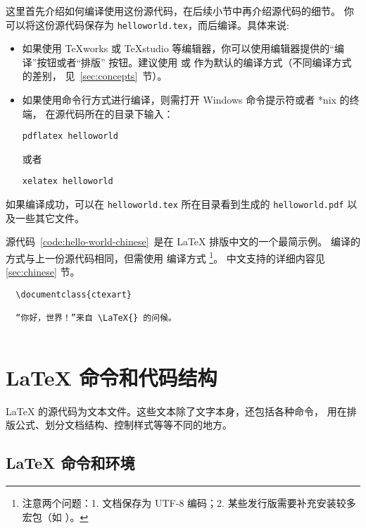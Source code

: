 这里首先介绍如何编译使用这份源代码，在后续小节中再介绍源代码的细节。
你可以将这份源代码保存为 \texttt{helloworld.tex}，而后编译。具体来说:
\begin{itemize}
  \item 如果使用 TeXworks 或 TeXstudio 等编辑器，你可以使用编辑器提供的“编译”按钮或者“排版”
  按钮。建议使用  或  作为默认的编译方式（不同编译方式的差别，
  见~\ref{sec:concepts}~节）。
  \item 如果使用命令行方式进行编译，则需打开 Windows 命令提示符或者 *nix 的终端，
  在源代码所在的目录下输入：
\begin{verbatim}
pdflatex helloworld
\end{verbatim}
或者
\begin{verbatim}
xelatex helloworld
\end{verbatim}
\end{itemize}

如果编译成功，可以在 \texttt{helloworld.tex} 所在目录看到生成的 \texttt{helloworld.pdf} 以及一些其它文件。

源代码~\ref{code:hello-world-chinese}~是在 \LaTeX{} 排版中文的一个最简示例。
编译的方式与上一份源代码相同，但需使用  编译方式%
\footnote{注意两个问题：1. 文档保存为 UTF-8 编码；2. 某些发行版需要补充安装较多宏包（如 ）。}。
中文支持的详细内容见 \ref{sec:chinese} 节。

\begin{sourcecode}[htp]
  \begin{Verbatim}
  \documentclass{ctexart}
  
  “你好，世界！”来自 \LaTeX{} 的问候。
  
  \end{Verbatim}
  \caption{在\LaTeX{} 中排版中文的最简源代码示例。}\label{code:hello-world-chinese}
\end{sourcecode}

\section{\LaTeX{} 命令和代码结构}\label{sec:src}

\LaTeX{} 的源代码为文本文件。这些文本除了文字本身，还包括各种命令，
用在排版公式、划分文档结构、控制样式等等不同的地方。

\subsection{\LaTeX{} 命令和环境}\label{subsec:cmds}


